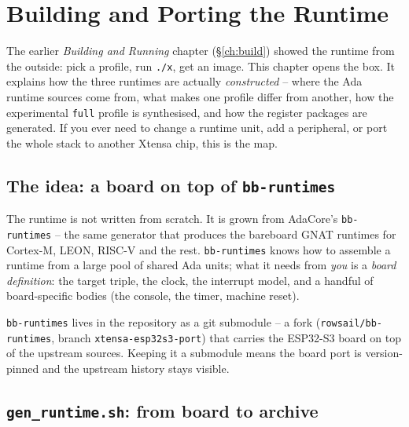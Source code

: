 \chapter{Building and Porting the Runtime}
\label{ch:runtime-build}

The earlier \emph{Building and Running} chapter (\S\ref{ch:build}) showed the
runtime from the outside: pick a profile, run \texttt{./x}, get an image. This
chapter opens the box. It explains how the three runtimes are actually
\emph{constructed} -- where the Ada runtime sources come from, what makes one
profile differ from another, how the experimental \texttt{full} profile is
synthesised, and how the register packages are generated. If you ever need to
change a runtime unit, add a peripheral, or port the whole stack to another
Xtensa chip, this is the map.

\section{The idea: a board on top of \texttt{bb-runtimes}}

The runtime is not written from scratch. It is grown from AdaCore's
\texttt{bb-runtimes} -- the same generator that produces the bareboard GNAT
runtimes for Cortex-M, LEON, RISC-V and the rest. \texttt{bb-runtimes} knows how
to assemble a runtime from a large pool of shared Ada units; what it needs from
\emph{you} is a \emph{board definition}: the target triple, the clock, the
interrupt model, and a handful of board-specific bodies (the console, the timer,
machine reset).

\texttt{bb-runtimes} lives in the repository as a git submodule -- a fork
(\texttt{rowsail/bb-runtimes}, branch \texttt{xtensa-esp32s3-port}) that carries
the ESP32-S3 board on top of the upstream sources. Keeping it a submodule means
the board port is version-pinned and the upstream history stays visible.


\section{\texttt{gen\_runtime.sh}: from board to archive}

